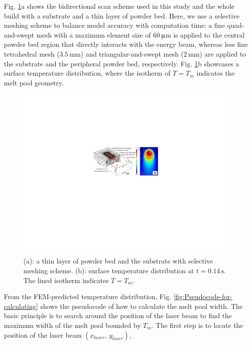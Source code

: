 \documentclass [11pt, proquest] {uwthesis}[2020/02/24]
\begin{document}
Fig. \ref{fig:Mesh-and-scan}a shows the bidirectional scan scheme
used in this study and the whole build with a substrate and a thin
layer of powder bed. Here, we use a selective meshing scheme to balance
model accuracy with computation time: a fine quad-and-swept mesh with
a maximum element size of $60\,$$\muup$m is applied to the central
powder bed region that directly interacts with the energy beam, whereas
less fine tetrahedral mesh ($3.5\,\text{mm}$) and triangular-and-swept
mesh ($2\,\text{mm}$) are applied to the substrate and the peripheral
powder bed, respectively. Fig. \ref{fig:Mesh-and-scan}b showcases
a surface temperature distribution, where the isotherm of $T=T_{m}$
indicates the melt pool geometry.

\begin{figure}[!ht]
\begin{centering}
\includegraphics[clip,width=13cm]{Closed-loop-simulation/mesh_temp_distri}
\par\end{centering}
\centering{}\caption{\label{fig:Mesh-and-scan}(a): a thin layer of powder bed and the
substrate with selective meshing scheme. (b): surface temperature
distribution at $t=0.14\,\text{s}$. The lined isotherm indicates
$T=T_{m}$.}
\end{figure}
From the FEM-predicted temperature distribution, Fig. \ref{fig:Pseudocode-for-calculating}
shows the pseudocode of how to calculate the melt pool width. The
basic principle is to search around the position of the laser beam
to find the maximum width of the melt pool bounded by $T_{m}$. The
first step is to locate the position of the laser beam $(x_{laser},\,y_{laser})$,
\end{document}
